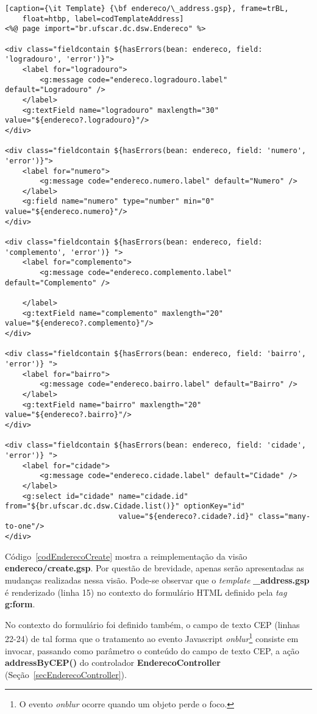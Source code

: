 \begin{lstlisting}[caption={\it Template} {\bf endereco/\_address.gsp}, frame=trBL,
    float=htbp, label=codTemplateAddress] 
<%@ page import="br.ufscar.dc.dsw.Endereco" %>

<div class="fieldcontain ${hasErrors(bean: endereco, field: 'logradouro', 'error')}">
    <label for="logradouro">
        <g:message code="endereco.logradouro.label" default="Logradouro" />
    </label>
    <g:textField name="logradouro" maxlength="30" value="${endereco?.logradouro}"/>
</div>

<div class="fieldcontain ${hasErrors(bean: endereco, field: 'numero', 'error')}">
    <label for="numero">
        <g:message code="endereco.numero.label" default="Numero" />
    </label>
    <g:field name="numero" type="number" min="0" value="${endereco.numero}"/>
</div>

<div class="fieldcontain ${hasErrors(bean: endereco, field: 'complemento', 'error')} ">
    <label for="complemento">
        <g:message code="endereco.complemento.label" default="Complemento" />

    </label>
    <g:textField name="complemento" maxlength="20" value="${endereco?.complemento}"/>
</div>

<div class="fieldcontain ${hasErrors(bean: endereco, field: 'bairro', 'error')} ">
    <label for="bairro">
        <g:message code="endereco.bairro.label" default="Bairro" />
    </label>
    <g:textField name="bairro" maxlength="20" value="${endereco?.bairro}"/>
</div>

<div class="fieldcontain ${hasErrors(bean: endereco, field: 'cidade', 'error')} ">
    <label for="cidade">
        <g:message code="endereco.cidade.label" default="Cidade" />
    </label>
    <g:select id="cidade" name="cidade.id" from="${br.ufscar.dc.dsw.Cidade.list()}" optionKey="id" 
                          value="${endereco?.cidade?.id}" class="many-to-one"/>
</div>
\end{lstlisting}

Código~\ref{codEnderecoCreate}   mostra   a   reimplementação  da   visão   {\bf
  endereco/create.gsp}. Por  questão de brevidade, apenas  serão apresentadas as
mudanças realizadas  nessa visão.   Pode-se observar que  o {\it  template} {\bf
  \_address.gsp}  é  renderizado  (linha  15)  no contexto  do  formulário  HTML
definido pela {\it tag} {\bf g:form}. 

\newpage

No contexto  do formulário  foi definido  também, o campo  de texto  CEP (linhas
22-24)   de   tal  forma   que   o   tratamento   ao  evento   Javascript   {\it
  onblur}\footnote{O evento {\it onblur} ocorre  quando um objeto perde o foco.}
consiste em invocar, passando como parâmetro o conteúdo do campo de texto CEP, a
ação    {\bf   addressByCEP()}    do   controlador    {\bf   EnderecoController}
(Seção~\ref{secEnderecoController}).  

